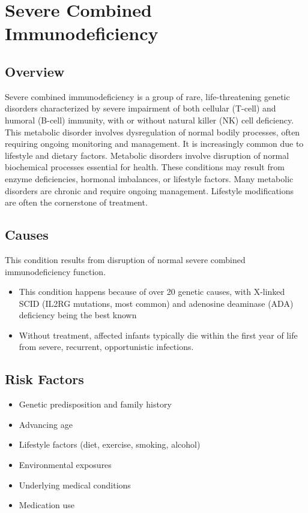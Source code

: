 \chapter{Severe Combined Immunodeficiency}
\label{sec:Severe Combined Immunodeficiency}

\section{Overview}
Severe combined immunodeficiency is a group of rare, life-threatening genetic disorders characterized by severe impairment of both cellular (T-cell) and humoral (B-cell) immunity, with or without natural killer (NK) cell deficiency. This metabolic disorder involves dysregulation of normal bodily processes, often requiring ongoing monitoring and management. It is increasingly common due to lifestyle and dietary factors. Metabolic disorders involve disruption of normal biochemical processes essential for health. These conditions may result from enzyme deficiencies, hormonal imbalances, or lifestyle factors. Many metabolic disorders are chronic and require ongoing management. Lifestyle modifications are often the cornerstone of treatment.
\section{Causes}
This condition results from disruption of normal severe combined immunodeficiency function.

\begin{itemize}[noitemsep]
  \item This condition happens because of over 20 genetic causes, with X-linked SCID (IL2RG mutations, most common) and adenosine deaminase (ADA) deficiency being the best known
  \item Without treatment, affected infants typically die within the first year of life from severe, recurrent, opportunistic infections.
\end{itemize}
\section{Risk Factors}
\begin{itemize}[noitemsep]
  \item Genetic predisposition and family history
  \item Advancing age
  \item Lifestyle factors (diet, exercise, smoking, alcohol)
  \item Environmental exposures
  \item Underlying medical conditions
  \item Medication use
\end{itemize}
